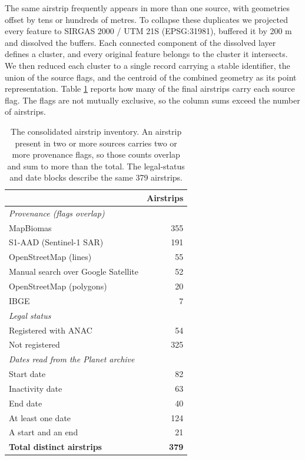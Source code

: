 \documentclass[11pt]{article}
\begin{document}
The same airstrip frequently appears in more than one source, with geometries offset by tens or hundreds of metres. To collapse these duplicates we projected every feature to SIRGAS 2000 / UTM 21S (EPSG:31981), buffered it by 200 m and dissolved the buffers. Each connected component of the dissolved layer defines a cluster, and every original feature belongs to the cluster it intersects. We then reduced each cluster to a single record carrying a stable identifier, the union of the source flags, and the centroid of the combined geometry as its point representation. Table \ref{tab:sources} reports how many of the final airstrips carry each source flag. The flags are not mutually exclusive, so the column sums exceed the number of airstrips.

\begin{table}[htbp]
\centering
\begin{tabular}{lr}
\hline
& Airstrips \\
\hline
\textit{Provenance (flags overlap)} & \\
\quad MapBiomas & 355 \\
\quad S1-AAD (Sentinel-1 SAR) & 191 \\
\quad OpenStreetMap (lines) & 55 \\
\quad Manual search over Google Satellite & 52 \\
\quad OpenStreetMap (polygons) & 20 \\
\quad IBGE & 7 \\
\hline
\textit{Legal status} & \\
\quad Registered with ANAC & 54 \\
\quad Not registered & 325 \\
\hline
\textit{Dates read from the Planet archive} & \\
\quad Start date & 82 \\
\quad Inactivity date & 63 \\
\quad End date & 40 \\
\quad At least one date & 124 \\
\quad A start and an end & 21 \\
\hline
\textbf{Total distinct airstrips} & \textbf{379} \\
\hline
\end{tabular}
\caption{The consolidated airstrip inventory. An airstrip present in two or more sources carries two or more provenance flags, so those counts overlap and sum to more than the total. The legal-status and date blocks describe the same 379 airstrips.}
\label{tab:sources}
\end{table}
\end{document}
